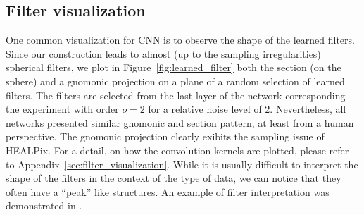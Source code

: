 \documentclass[final,twocolumn,3p,times,authoryear]{elsarticle}
\newcommand{\todo}[1]{{\color[rgb]{.6,.1,.6}{#1}}}
\newcommand{\figref}[1]{Figure~\ref{fig:#1}}
\newcommand{\1}{\b{1}}              %
\newcommand{\0}{\b{0}}              %
\begin{document}
\subsection{Filter visualization}
One common visualization for CNN is to observe the shape of the learned filters.
Since our construction leads to almost (up to the sampling irregularities)
spherical filters, we plot in \figref{learned_filter} both the section (on the
sphere) and a gnomonic projection on a plane of a random selection of learned
filters. The filters are selected from the last layer of the network
corresponding the experiment with order $o=2$ for a relative noise level of
$2$. Nevertheless, all networks presented similar gnomonic and section pattern, at least from a
human perspective. The gnomonic projection clearly exibits the sampling issue
of HEALPix.
For a detail, on how the convolution kernels are plotted, please refer to Appendix~\ref{sec:filter_visualization}.
While it is usually difficult to interpret the shape of the filters in the context of the type of data, we can notice that they often have a ``peak'' like structures.
An example of filter interpretation was demonstrated in \citep{Ribli2018learningfrom}.
\end{document}
